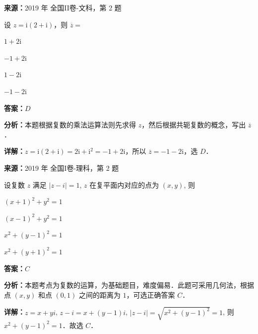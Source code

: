 \begin{question}[points=5]
\textbf{来源：}2019 年 全国II卷-文科，第 2 题\par
设 $z=\mathrm{i}(2+\mathrm{i})$，则 $\overline{z}=$
\begin{choices}
  \item $1+2\mathrm{i}$
  \item $-1+2\mathrm{i}$
  \item $1-2\mathrm{i}$
  \item $-1-2\mathrm{i}$
\end{choices}
\begin{solution}
\textbf{答案：}$D$

\textbf{分析：}本题根据复数的乘法运算法则先求得 $z$，然后根据共轭复数的概念，写出 $\overline{z}$．

\textbf{详解：}$z=\mathrm{i}(2+\mathrm{i})=2\mathrm{i}+\mathrm{i}^2=-1+2\mathrm{i}$，所以 $\overline{z}=-1-2\mathrm{i}$，选 $D$．
\end{solution}
\end{question}

\begin{question}[points=5]
\textbf{来源：}2019 年 全国I卷-理科，第 2 题\par
设复数 $z$ 满足 $|z - i| = 1$, $z$ 在复平面内对应的点为 $(x, y)$, 则
\begin{choices}
  \item $(x + 1)^2 + y^2 = 1$
  \item $(x - 1)^2 + y^2 = 1$
  \item $x^2 + (y - 1)^2 = 1$
  \item $x^2 + (y + 1)^2 = 1$
\end{choices}
\begin{solution}
\textbf{答案：}$C$

\textbf{分析：}本题考点为复数的运算，为基础题目，难度偏易．此题可采用几何法，根据点 $(x, y)$ 和点 $(0, 1)$ 之间的距离为 $1$，可选正确答案 $C$．

\textbf{详解：}$z = x + yi$, $z - i = x + (y - 1)i$, $|z - i| = \sqrt{x^2 + (y - 1)^2} = 1$, 则 $x^2 + (y - 1)^2 = 1$．故选 $C$．
\end{solution}
\end{question}


